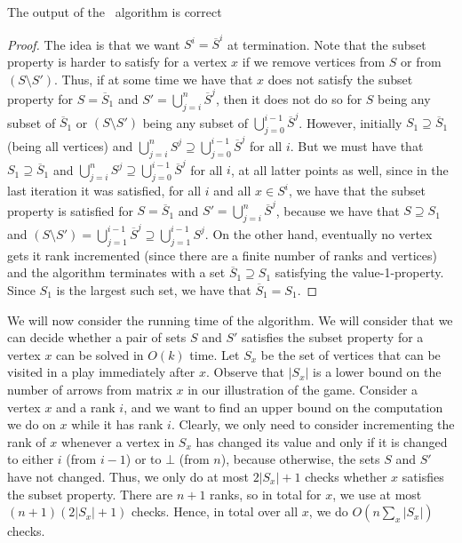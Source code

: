 \begin{lemma}
The output of the \crgLim\ algorithm is correct
\end{lemma}
\begin{proof}
The idea is that we want $S^i=\overline{S}^i$ at termination.
Note that the subset property is harder to satisfy for a vertex $x$ if we remove vertices from $S$ or from $(S\setminus S')$.
Thus, if at some time we have that $x$ does not satisfy the subset property for $S=\overline{S}_1$ and $S'=\bigcup_{j=i}^n \overline{S}^j$, then it does not do so for $S$ being any subset of $\overline{S}_1$ or $(S\setminus S')$ being any subset of $\bigcup_{j=0}^{i-1} \overline{S}^j$.
However, initially $S_1\supseteq\overline{S}_1$ (being all vertices) and $\bigcup_{j=i}^n S^j\supseteq \bigcup_{j=0}^{i-1} \overline{S}^j$ for all $i$. But we must have that $S_1\supseteq\overline{S}_1$ and $\bigcup_{j=i}^n S^j\supseteq \bigcup_{j=0}^{i-1} \overline{S}^j$ for all $i$, at all latter points as well, since in the last iteration it was satisfied, for all $i$ and all $x\in S^i$, we have that the subset property is satisfied for $S=\overline{S}_1$ and $S'=\bigcup_{j=i}^n \overline{S}^j$, because we have that $S\supseteq S_1$ and $(S\setminus S')=\bigcup_{j=1}^{i-1} \overline{S}^j\supseteq \bigcup_{j=1}^{i-1} S^j$.
On the other hand, eventually no vertex gets it rank incremented (since there are a finite number of ranks and vertices) and the algorithm terminates with a set $\overline{S}_1\supseteq S_1$ satisfying the value-1-property. Since $S_1$ is the largest such set, we have that $\overline{S}_1=S_1$.
\end{proof}


We will now consider the running time of the algorithm.
We will consider that we can decide whether a pair of sets $S$ and $S'$ satisfies the subset property for a vertex $x$ can be solved in $O(k)$ time.
Let $S_x$ be the set of vertices that can be visited in a play immediately after $x$. Observe that $|S_x|$ is a lower bound on the number of arrows from matrix $x$ in our illustration of the game.
Consider a vertex $x$ and a rank $i$, and we want to find an upper bound on the computation we do on $x$ while it has rank $i$.
Clearly, we only need to consider incrementing the rank of $x$ whenever a vertex in $S_x$ has changed its value and only if it is changed to either $i$ (from $i-1$) or to $\bot$ (from $n$), because otherwise, the sets $S$ and $S'$ have not changed. 
Thus, we only do at most $2|S_x|+1$ checks whether $x$ satisfies the subset property.
There are $n+1$ ranks, so in total for $x$, we use at most $(n+1)(2|S_x|+1)$ checks.
Hence, in total over all $x$, we do $O(n\sum_{x} |S_x|)$ checks.

